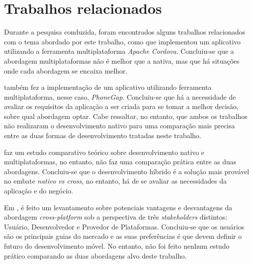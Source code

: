 \begin{comment}
aqui eu trago o leitor pro nosso trabalho, ateh entao era coisas dos outros, aqui eu informo que meu trabalho vai ser esse
na introducao da metodologia, fazer esse resgate ao problema
qual a metodologia do estudo comparativo
em relacao ao que existe na literatura
estao discutindo isso
concluir dizendo o que vamos fazer de diferente, um estudo comparativo
dado isso nossa questao problema é: ....

Após o estudo e desenvolvimento da multiplataforma, pode-se concluir que a hipótese \textbf{H1}, está correta, visto que as ferramentas de desenvolvimento multiplataformas evoluiram muito ao longo dos últimos 
cinco anos, e atualmente, estão muito próximas das plataformas nativas...
\end{comment}

\section{Trabalhos relacionados} \label{sec:trabalhosrelacionados}

Durante a pesquisa conduzida, foram encontrados alguns trabalhos relacionados com o tema abordado por este trabalho, como 
que implementou um aplicativo utilizando a ferramenta multiplataforma \textit{Apache Cordova}. Concluiu-se que a abordagem multiplataformas 
não é melhor que a nativa, mas que há situações onde cada abordagem se encaixa melhor.

 também fez a implementação de um aplicativo utilizando ferramenta multiplataforma, nesse caso, \textit{PhoneGap}. 
Concluiu-se que há a necessidade de avaliar os requisitos da aplicação a ser criada para se tomar a melhor decisão, sobre qual abordagem optar.
Cabe ressaltar, no entanto, que ambos os trabalhos não realizaram o desenvolvimento nativo para uma comparação mais precisa entre as duas formas de desenvolvimento
tratadas neste trabalho. 

 faz um estudo comparativo teórico sobre desenvolvimento nativo e multiplataformas, no entanto,
não faz uma comparação prática entre as duas abordagens. Concluiu-se que o desenvolvimento híbrido é a solução mais provável no embate 
\textit{nativo vs cross}, no entanto, há de se avaliar as necessidades da aplicação e do negócio.

Em , é feito um levantamento sobre potenciais vantagens e desvantagens da abordagem \textit{cross-platform} sob a 
perspectiva de três \textit{stakeholders} distintos: Usuário, Desenvolvedor e Provedor de Plataformas. Concluiu-se que os usuários são os principais
guias do mercado e as suas preferências é que devem definir o futuro do desenvolvimento móvel. No entanto, não foi feito nenhum estudo prático comparando
as duas abordagens alvo deste trabalho.

